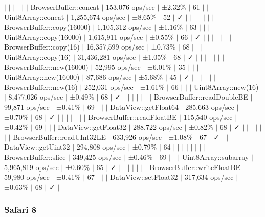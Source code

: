 $\vert$ $\vert$ $\vert$ $\vert$ $\vert$ $\vert$ Browser\+Buffer\+::concat $\vert$ 153,076 ops/sec $\vert$ ±2.32\% $\vert$ 61 $\vert$ $\vert$ $\vert$ Uint8\+Array\+::concat $\vert$ 1,255,674 ops/sec $\vert$ ±8.65\% $\vert$ 52 $\vert$ ✓ $\vert$ $\vert$ $\vert$ $\vert$ $\vert$ $\vert$ $\vert$ Browser\+Buffer\+::copy(16000) $\vert$ 1,105,312 ops/sec $\vert$ ±1.16\% $\vert$ 63 $\vert$ $\vert$ $\vert$ Uint8\+Array\+::copy(16000) $\vert$ 1,615,911 ops/sec $\vert$ ±0.55\% $\vert$ 66 $\vert$ ✓ $\vert$ $\vert$ $\vert$ $\vert$ $\vert$ $\vert$ $\vert$ Browser\+Buffer\+::copy(16) $\vert$ 16,357,599 ops/sec $\vert$ ±0.73\% $\vert$ 68 $\vert$ $\vert$ $\vert$ Uint8\+Array\+::copy(16) $\vert$ 31,436,281 ops/sec $\vert$ ±1.05\% $\vert$ 68 $\vert$ ✓ $\vert$ $\vert$ $\vert$ $\vert$ $\vert$ $\vert$ $\vert$ Browser\+Buffer\+::new(16000) $\vert$ 52,995 ops/sec $\vert$ ±6.01\% $\vert$ 35 $\vert$ $\vert$ $\vert$ Uint8\+Array\+::new(16000) $\vert$ 87,686 ops/sec $\vert$ ±5.68\% $\vert$ 45 $\vert$ ✓ $\vert$ $\vert$ $\vert$ $\vert$ $\vert$ $\vert$ $\vert$ Browser\+Buffer\+::new(16) $\vert$ 252,031 ops/sec $\vert$ ±1.61\% $\vert$ 66 $\vert$ $\vert$ $\vert$ Uint8\+Array\+::new(16) $\vert$ 8,477,026 ops/sec $\vert$ ±0.49\% $\vert$ 68 $\vert$ ✓ $\vert$ $\vert$ $\vert$ $\vert$ $\vert$ $\vert$ $\vert$ Browser\+Buffer\+::read\+Double\+BE $\vert$ 99,871 ops/sec $\vert$ ±0.41\% $\vert$ 69 $\vert$ $\vert$ $\vert$ Data\+View\+::get\+Float64 $\vert$ 285,663 ops/sec $\vert$ ±0.70\% $\vert$ 68 $\vert$ ✓ $\vert$ $\vert$ $\vert$ $\vert$ $\vert$ $\vert$ $\vert$ Browser\+Buffer\+::read\+Float\+BE $\vert$ 115,540 ops/sec $\vert$ ±0.42\% $\vert$ 69 $\vert$ $\vert$ $\vert$ Data\+View\+::get\+Float32 $\vert$ 288,722 ops/sec $\vert$ ±0.82\% $\vert$ 68 $\vert$ ✓ $\vert$ $\vert$ $\vert$ $\vert$ $\vert$ $\vert$ $\vert$ Browser\+Buffer\+::read\+U\+Int32\+LE $\vert$ 633,926 ops/sec $\vert$ ±1.08\% $\vert$ 67 $\vert$ ✓ $\vert$ $\vert$ Data\+View\+::get\+Uint32 $\vert$ 294,808 ops/sec $\vert$ ±0.79\% $\vert$ 64 $\vert$ $\vert$ $\vert$ $\vert$ $\vert$ $\vert$ $\vert$ $\vert$ Browser\+Buffer\+::slice $\vert$ 349,425 ops/sec $\vert$ ±0.46\% $\vert$ 69 $\vert$ $\vert$ $\vert$ Uint8\+Array\+::subarray $\vert$ 5,965,819 ops/sec $\vert$ ±0.60\% $\vert$ 65 $\vert$ ✓ $\vert$ $\vert$ $\vert$ $\vert$ $\vert$ $\vert$ $\vert$ Browser\+Buffer\+::write\+Float\+BE $\vert$ 59,980 ops/sec $\vert$ ±0.41\% $\vert$ 67 $\vert$ $\vert$ $\vert$ Data\+View\+::set\+Float32 $\vert$ 317,634 ops/sec $\vert$ ±0.63\% $\vert$ 68 $\vert$ ✓ $\vert$

\subsubsection*{Safari 8}

